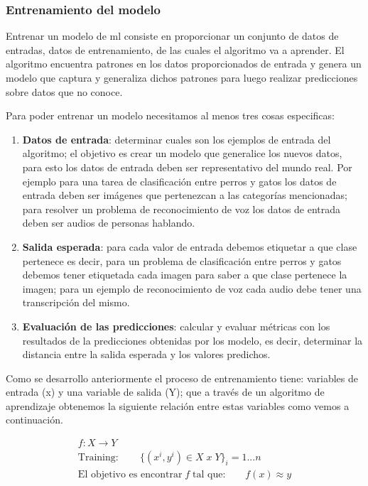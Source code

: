 \subsubsection{Entrenamiento del modelo}
Entrenar un modelo de \ac{ml} consiste en proporcionar un conjunto de datos de entradas, datos de entrenamiento, de las cuales el algoritmo va a aprender. El algoritmo encuentra patrones en los datos proporcionados de entrada y genera un modelo que captura y generaliza dichos patrones para luego realizar predicciones sobre datos que no conoce.

Para poder entrenar un modelo necesitamos al menos tres cosas especificas:
\begin{enumerate}
\item \textbf{Datos de entrada}: determinar cuales son los ejemplos de entrada del algoritmo; el objetivo es crear un modelo que generalice los nuevos datos, para esto los datos de entrada deben ser representativo del mundo real. Por ejemplo para una tarea de clasificación entre perros y gatos los datos de entrada deben ser imágenes que pertenezcan a las categorías mencionadas; para resolver un problema de reconocimiento de voz los datos de entrada deben ser audios de personas hablando.

\item \textbf{Salida esperada}: para cada valor de entrada debemos etiquetar a que clase pertenece es decir, para un problema de clasificación entre perros y gatos debemos tener etiquetada cada imagen para saber a que clase pertenece la imagen; para un ejemplo de reconocimiento de voz cada audio debe tener una transcripción del mismo.

\item \textbf{Evaluación de las predicciones}: calcular y evaluar métricas con los resultados de la predicciones obtenidas por los modelo, es decir, determinar la distancia entre la salida esperada y los valores predichos.
\end{enumerate}

Como se desarrollo anteriormente el proceso de entrenamiento tiene: variables de entrada (x) y una variable de salida (Y); que a través de un algoritmo de aprendizaje obtenemos la siguiente relación entre estas variables como vemos a continuación.


\begin{eqnarray}
 f:X \longrightarrow Y\\
 \mbox{Training}:\qquad \{(x^i, y^i) \in X\; x\; Y \} _i=1...n\\
 \mbox{El objetivo es encontrar}\; f\; \mbox{tal que:}\qquad f(x)\approx y
\end{eqnarray}

